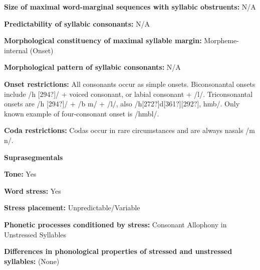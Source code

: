 \begin{styleBody}
\textbf{Size of maximal word{}-marginal sequences with syllabic obstruents:} N/A
\end{styleBody}

\begin{styleBody}
\textbf{Predictability of syllabic consonants:} N/A
\end{styleBody}

\begin{styleBody}
\textbf{Morphological constituency of maximal syllable margin:} Morpheme-internal (Onset)
\end{styleBody}

\begin{styleBody}
\textbf{Morphological pattern of syllabic consonants:} N/A
\end{styleBody}

\begin{styleBody}
\textbf{Onset restrictions:} All consonants occur as simple onsets. Biconsonantal onsets include /h [294?]/ + voiced consonant, or labial consonant + /l/. Triconsonantal onsets are /h [294?]/ + /b m/ + /l/, also /h[272?]d[361?][292?], hmb/. Only known example of four-consonant onset is /hmbl/.
\end{styleBody}

\begin{styleBody}
\textbf{Coda restrictions:} Codas occur in rare circumstances and are always nasals /m n/.
\end{styleBody}

\begin{styleBody}
\textbf{Suprasegmentals}
\end{styleBody}

\begin{styleBody}
\textbf{Tone:} Yes
\end{styleBody}

\begin{styleBody}
\textbf{Word stress:} Yes
\end{styleBody}

\begin{styleBody}
\textbf{Stress placement:} Unpredictable/Variable
\end{styleBody}

\begin{styleBody}
\textbf{Phonetic processes conditioned by stress:} Consonant Allophony in Unstressed Syllables
\end{styleBody}

\begin{styleBody}
\textbf{Differences in phonological properties of stressed and unstressed syllables:} (None)
\end{styleBody}

